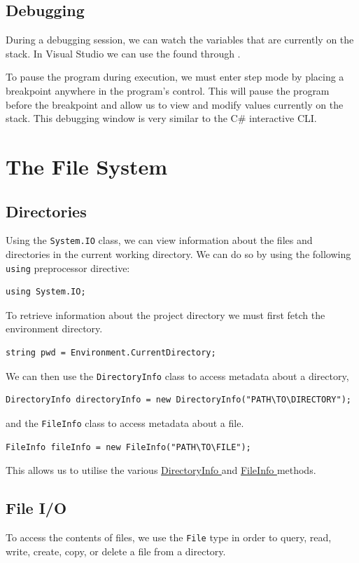 \documentclass{article}
\begin{document}
\subsection{Debugging}
During a debugging session, we can watch the variables that are
currently on the stack. In Visual Studio we can use the  found through .

To pause the program during execution, we must enter step mode by
placing a breakpoint anywhere in the program's control. This will pause
the program before the breakpoint and allow us to view and modify
values currently on the stack. This debugging window is very similar to
the C\# interactive CLI.
\section{The File System}
\subsection{Directories}
Using the \texttt{System.IO} class, we can view information
about the files and directories in the current working directory. We
can do so by using the following \texttt{using}
preprocessor directive:
\begin{verbatim}
using System.IO;
\end{verbatim}
To retrieve information about the project directory we must first fetch
the environment directory.
\begin{verbatim}
string pwd = Environment.CurrentDirectory;
\end{verbatim}
We can then use the \texttt{DirectoryInfo} class to access
metadata about a directory,
\begin{verbatim}
DirectoryInfo directoryInfo = new DirectoryInfo("PATH\TO\DIRECTORY");
\end{verbatim}
and the \texttt{FileInfo} class to access metadata about a
file.
\begin{verbatim}
FileInfo fileInfo = new FileInfo("PATH\TO\FILE");
\end{verbatim}
This allows us to utilise the various
\href{https://docs.microsoft.com/en-us/dotnet/api/system.io.directoryinfo?view=net-6.0#methods}{DirectoryInfo
} and
\href{https://docs.microsoft.com/en-us/dotnet/api/system.io.fileinfo?view=net-6.0#methods}{FileInfo
} methods.
\subsection{File I/O}
To access the contents of files, we use the \texttt{File}
type in order to query, read, write, create, copy, or delete a file
from a directory.
\end{document}
